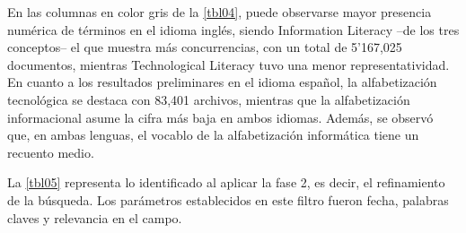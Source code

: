 \documentclass[spanish]{textolivre}
\begin{document}
En las columnas en color gris de la \cref{tbl04}, puede observarse mayor presencia numérica de términos en el idioma inglés, siendo Information Literacy –de los tres conceptos– el que muestra más concurrencias, con un total de 5’167,025 documentos, mientras Technological Literacy tuvo una menor representatividad. En cuanto a los resultados preliminares en el idioma español, la alfabetización tecnológica se destaca con 83,401 archivos, mientras que la alfabetización informacional asume la cifra más baja en ambos idiomas. Además, se observó que, en ambas lenguas, el vocablo de la alfabetización informática tiene un recuento medio.

La \cref{tbl05} representa lo identificado al aplicar la fase 2, es decir, el refinamiento de la búsqueda. Los parámetros establecidos en este filtro fueron fecha, palabras claves y relevancia en el campo.
\end{document}
